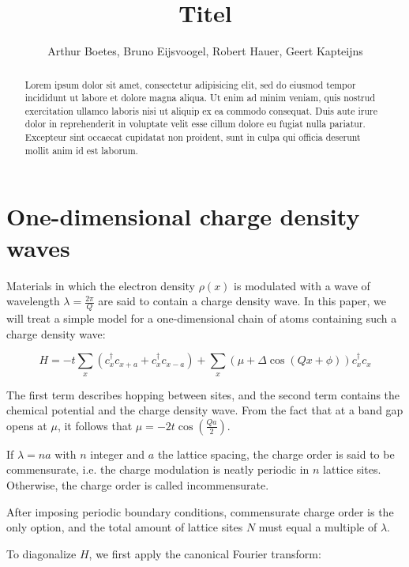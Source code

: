\documentclass[letterpaper, 10 pt, conference]{ieeeconf}  %
\title{\LARGE \bf
  Titel
}
\author{Arthur Boetes, Bruno Eijsvoogel, Robert Hauer, Geert Kapteijns
}
\begin{document}
\maketitle
\thispagestyle{empty}
\pagestyle{empty}


\begin{abstract}

Lorem ipsum dolor sit amet, consectetur adipisicing elit, sed do eiusmod tempor
incididunt ut labore et dolore magna aliqua. Ut enim ad minim veniam, quis
nostrud exercitation ullamco laboris nisi ut aliquip ex ea commodo consequat.
Duis aute irure dolor in reprehenderit in voluptate velit esse cillum dolore eu
fugiat nulla pariatur. Excepteur sint occaecat cupidatat non proident, sunt in
culpa qui officia deserunt mollit anim id est laborum.
\end{abstract}


\section{One-dimensional charge density waves}

Materials in which the electron density $\rho(x)$ is modulated with a wave of
wavelength $\lambda = \frac{2\pi}{Q}$ are said to contain a charge density wave.
In this paper, we will treat a simple model for a one-dimensional chain of atoms containing such a charge density wave:

$$ H = -t \sum_x (c_x^{\dagger}c_{x+a} + c_x^{\dagger}c_{x-a}) + \sum_x (\mu + \Delta \cos(Qx + \phi))c_x^{\dagger}c_x $$

The first term describes hopping between sites, and the second term contains the chemical potential and the charge density wave. From the fact that at a band gap opens at $\mu$, it follows that $\mu = -2t\cos(\frac{Qa}{2})$.

If $\lambda = n a$ with $n$ integer and $a$ the lattice spacing, the charge order is said to be commensurate, i.e. the charge modulation is neatly periodic in $n$ lattice sites. Otherwise, the charge order is called incommensurate.

After imposing periodic boundary conditions, commensurate charge order is the only option, and the total amount of lattice sites $N$ must equal a multiple of $\lambda$.

To diagonalize $H$, we first apply the canonical Fourier transform:
\end{document}
